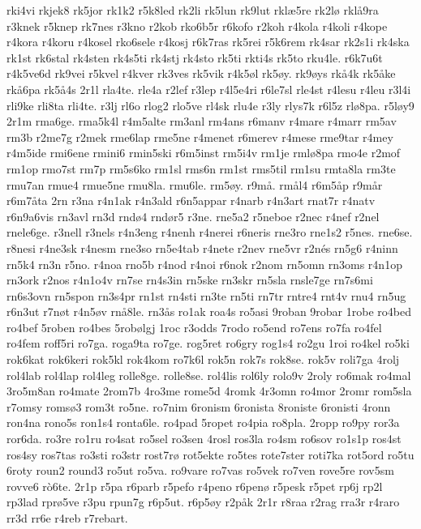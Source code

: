 {rki4vi
rkjek8
rk5jor
rk1k2
r5k8led
rk2li
rk5lun
rk9lut
rkl^^e65re
rk2l^^f8
rkl^^e59ra
r3knek
r5knep
rk7nes
r3kno
r2kob
rko6b5r
r6kofo
r2koh
r4kola
r4koli
r4kope
r4kora
r4koru
r4kosel
rko6sele
r4kosj
r6k7ras
rk5rei
r5k6rem
rk4sar
rk2s1i
rk4ska
rk1st
rk6stal
rk4sten
rk4s5ti
rk4stj
rk4sto
rk5ti
rkti4s
rk5to
rku4le.
r6k7u6t
r4k5ve6d
rk9vei
r5kvel
r4kver
rk3ves
rk5vik
r4k5^^f8l
rk5^^f8y.
rk9^^f8ys
rk^^e54k
rk5^^e5ke
rk^^e56pa
rk5^^e54s
2r1l
rla4te.
rle4a
r2lef
r3lep
r4l5e4ri
r6le7sl
rle4st
r4lesu
r4leu
r3l4i
rli9ke
rli8ta
rli4te.
r3lj
rl6o
rlog2
rlo5ve
rl4sk
rlu4e
r3ly
rlys7k
r6l5z
rl^^f88pa.
r5l^^f8y9
2r1m
rma6ge.
rma5k4l
r4m5alte
rm3anl
rm4ans
r6manv
r4mare
r4marr
rm5av
rm3b
r2me7g
r2mek
rme6lap
rme5ne
r4menet
r6merev
r4mese
rme9tar
r4mey
r4m5ide
rmi6ene
rmini6
rmin5ski
r6m5inst
rm5i4v
rm1je
rml^^f88pa
rmo4e
r2mof
rm1op
rmo7st
rm7p
rm5s6ko
rm1sl
rms6n
rm1st
rms5til
rm1su
rmta8la
rm3te
rmu7an
rmue4
rmue5ne
rmu8la.
rmu6le.
rm5^^f8y.
r9m^^e5.
rm^^e5l4
r6m5^^e5p
r9m^^e5r
r6m7^^e5ta
2rn
r3na
r4n1ak
r4n3ald
r6n5appar
r4narb
r4n3art
rnat7r
r4natv
r6n9a6vis
rn3avl
rn3d
rnd^^f84
rnd^^f8r5
r3ne.
rne5a2
r5neboe
r2nec
r4nef
r2nel
rnele6ge.
r3nell
r3nels
r4n3eng
r4nenh
r4nerei
r6neris
rne3ro
rne1s2
r5nes.
rne6se.
r8nesi
r4ne3sk
r4nesm
rne3so
rn5e4tab
r4nete
r2nev
rne5vr
r2n^^e9s
rn5g6
r4ninn
rn5k4
rn3n
r5no.
r4noa
rno5b
r4nod
r4noi
r6nok
r2nom
rn5omn
rn3oms
r4n1op
rn3ork
r2nos
r4n1o4v
rn7se
rn4s3in
rn5ske
rn3skr
rn5sla
rnsle7ge
rn7s6mi
rn6s3ovn
rn5spon
rn3s4pr
rn1st
rn4sti
rn3te
rn5ti
rn7tr
rntre4
rnt4v
rnu4
rn5ug
r6n3ut
r7n^^f8t
r4n5^^f8v
rn^^e58le.
rn3^^e5s
ro1ak
roa4s
ro5asi
9roban
9robar
1robe
ro4bed
ro4bef
5roben
ro4bes
5rob^^f8lgj
1roc
r3odds
7rodo
ro5end
ro7ens
ro7fa
ro4fel
ro4fem
roff5ri
ro7ga.
roga9ta
ro7ge.
rog5ret
ro6gry
rog1s4
ro2gu
1roi
ro4kel
ro5ki
rok6kat
rok6keri
rok5kl
rok4kom
ro7k6l
rok5n
rok7s
rok8se.
rok5v
roli7ga
4rolj
rol4lab
rol4lap
rol4leg
rolle8ge.
rolle8se.
rol4lis
rol6ly
rolo9v
2roly
ro6mak
ro4mal
3ro5m8an
ro4mate
2rom7b
4ro3me
rome5d
4romk
4r3omn
ro4mor
2romr
rom5sla
r7omsy
roms^^f83
rom3t
ro5ne.
ro7nim
6ronism
6ronista
8roniste
6ronisti
4ronn
ron4na
rono5s
ron1s4
ronta6le.
ro4pad
5ropet
ro4pia
ro8pla.
2ropp
ro9py
ror3a
ror6da.
ro3re
ro1ru
ro4sat
ro5sel
ro3sen
4rosl
ros3la
ro4sm
ro6sov
ro1s1p
ros4st
ros4sy
ros7tas
ro3sti
ro3str
rost7r^^f8
rot5ekte
ro5tes
rote7ster
roti7ka
rot5ord
ro5tu
6roty
roun2
round3
ro5ut
ro5va.
ro9vare
ro7vas
ro5vek
ro7ven
rove5re
rov5sm
rovve6
r^^f26te.
2r1p
r5pa
r6parb
r5pefo
r4peno
r6pen^^f8
r5pesk
r5pet
rp6j
rp2l
rp3lad
rpr^^f85ve
r3pu
rpun7g
r6p5ut.
r6p5^^f8y
r2p^^e5k
2r1r
r8raa
r2rag
rra3r
r4raro
rr3d
rr6e
r4reb
r7rebart.
}
